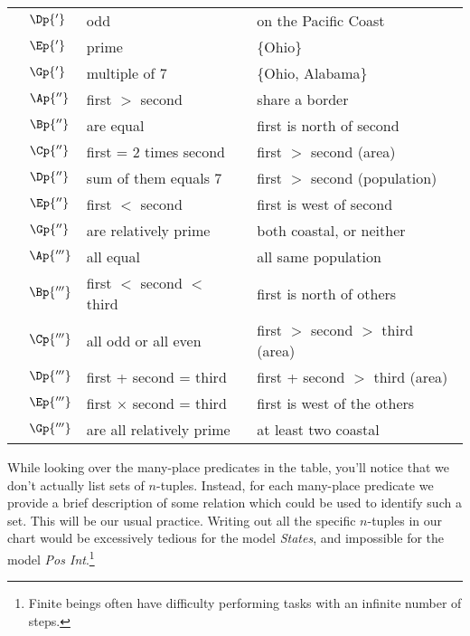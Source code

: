 \begin{longtable}[c]{ l l l l }
	&$\Dp{'}$&odd&on the Pacific Coast\\
	&$\Ep{'}$&prime&\{Ohio\}\\
	&$\Gp{'}$&multiple of 7&\{Ohio, Alabama\}\\ \addlinespace[.25cm]
	{2-place:}&$\Ap{''}$&first $>$ second&share a border\\
	&$\Bp{''}$&are equal&first is north of second\\
	&$\Cp{''}$&first = 2 times second&first $>$ second (area)\\
	&$\Dp{''}$&sum of them equals 7&first $>$ second (population)\\
	&$\Ep{''}$&first $<$ second&first is west of second\\
	&$\Gp{''}$&are relatively prime&both coastal, or neither\\ \addlinespace[.25cm]
	{3-place:}&$\Ap{'''}$&all equal&all same population\\
	&$\Bp{'''}$&first $<$ second $<$ third&first is north of others\\
	&$\Cp{'''}$&all odd or all even&first $>$ second $>$ third (area)\\
	&$\Dp{'''}$&first + second = third&first + second $>$ third (area)\\
	&$\Ep{'''}$&first $\times$ second = third&first is west of the others\\
	&$\Gp{'''}$&are all relatively prime& at least two coastal \\
\end{longtable}

While looking over the many-place predicates in the table, you'll notice that we don't actually list sets of $n$-tuples. 
Instead, for each many-place predicate we provide a brief description of some relation which could be used to identify such a set. 
This will be our usual practice. 
Writing out all the specific $n$-tuples in our chart would be excessively tedious for the model \emph{States}, and impossible for the model \emph{Pos Int}.\footnote{Finite beings often have difficulty performing tasks with an infinite number of steps.}

